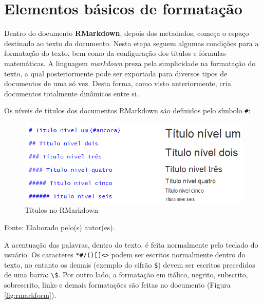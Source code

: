 \documentclass[12pt,portuguese,oneside]{book}
\begin{document}
\section{Elementos básicos de
formatação}\label{elementos-basicos-de-formatacao}

Dentro do documento \textbf{RMarkdown}, depois dos metadados, começa o
espaço destinado ao texto do documento. Nesta etapa seguem algumas
condições para a formatação do texto, bem como da configuração dos
títulos e fórmulas matemáticas. A linguagem \emph{markdown} preza pela
simplicidade na formatação do texto, a qual posteriormente pode ser
exportada para diversos tipos de documentos de uma só vez. Desta forma,
como visto anteriormente, cria documentos totalmente dinâmicos entre si.

Os níveis de títulos dos documentos RMarkdown são definidos pelo símbolo
\texttt{\#}:

\begin{figure}[H]

{\centering \includegraphics[width=0.8\linewidth]{rmarktit} 

}

\caption{Títulos no RMarkdown}\label{fig:rmarktit}
\end{figure}

Fonte: Elaborado pelo(s) autor(es).

A acentuação das palavras, dentro do texto, é feita normalmente pelo
teclado do usuário. Os caracteres
\texttt{*\#/(){[}{]}\textless{}\textgreater{}} podem ser escritos
normalmente dentro do texto, no entanto os demais (exemplo do cifrão
\texttt{\$}) devem ser escritos precedidos de uma barra:
\texttt{\textbackslash{}\$}. Por outro lado, a formatação em itálico,
negrito, subscrito, sobrescrito, links e demais formatações são feitas
no documento (Figura \ref{fig:rmarkform}).
\end{document}
